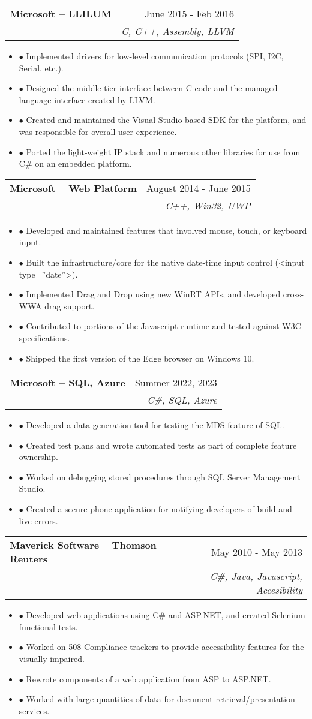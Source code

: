 \documentclass[a4paper,11pt]{article}
\makeatletter
\newcommand{\resumeExp}[4]{
\vspace{0mm}\item[]
    \begin{tabular*}{\textwidth}[t]{l@{\extracolsep{\fill}}r}
        \hspace{-4.4mm} \small\textbf{#1} & {\footnotesize{#3}}\vspace{-1.2mm}\\
        \hspace{-4.3mm} \footnotesize{\text{#2}} & \footnotesize{\textit{#4}}
    \end{tabular*}
    \vspace{-6.1mm}
}
\newcommand{\resumeItemListStart}{\begin{justify}\begin{itemize}[leftmargin=3ex, rightmargin=2ex, noitemsep,labelsep=1.2mm,itemsep=0mm]\small}
\newcommand{\resumeItemListEnd}{\end{itemize}\end{justify}\vspace{1.5mm}}
\makeatother
\begin{document}
\resumeExp
{Microsoft – LLILUM}
{SDE II}
{June 2015 - Feb 2016}
{C, C++, Assembly, LLVM}
\resumeItemListStart
\item[$\bullet$] Implemented drivers for low-level communication protocols (SPI, I2C, Serial, etc.).
\item[$\bullet$] Designed the middle-tier interface between C code and the managed-language interface created by LLVM.
\item[$\bullet$] Created and maintained the Visual Studio-based SDK for the platform, and was responsible for overall user experience.
\item[$\bullet$] Ported the light-weight IP stack and numerous other libraries for use from C\# on an embedded platform.
\resumeItemListEnd


\resumeExp
{Microsoft – Web Platform}
{SDE}
{August 2014 - June 2015}
{C++, Win32, UWP}
\resumeItemListStart
\item[$\bullet$] Developed and maintained features that involved mouse, touch, or keyboard input.
\item[$\bullet$] Built the infrastructure/core for the native date-time input control (<input type=”date”>).
\item[$\bullet$] Implemented Drag and Drop using new WinRT APIs, and developed cross-WWA drag support.
\item[$\bullet$] Contributed to portions of the Javascript runtime and tested against W3C specifications.
\item[$\bullet$] Shipped the first version of the Edge browser on Windows 10.
\resumeItemListEnd

\pagebreak

\resumeExp
{Microsoft – SQL, Azure}
{Intern}
{Summer 2022, 2023}
{C\#, SQL, Azure}
\resumeItemListStart
\item[$\bullet$] Developed a data-generation tool for testing the MDS feature of SQL.
\item[$\bullet$] Created test plans and wrote automated tests as part of complete feature ownership.
\item[$\bullet$] Worked on debugging stored procedures through SQL Server Management Studio.
\item[$\bullet$] Created a secure phone application for notifying developers of build and live errors.
\resumeItemListEnd


\resumeExp
{Maverick Software – Thomson Reuters}
{SDET Consultant}
{May 2010 - May 2013}
{C\#, Java, Javascript, Accesibility}
\resumeItemListStart
\item[$\bullet$] Developed web applications using C\# and ASP.NET, and created Selenium functional tests.
\item[$\bullet$] Worked on 508 Compliance trackers to provide accessibility features for the visually-impaired.
\item[$\bullet$] Rewrote components of a web application from ASP to ASP.NET.
\item[$\bullet$] Worked with large quantities of data for document retrieval/presentation services.
\resumeItemListEnd
\end{document}
